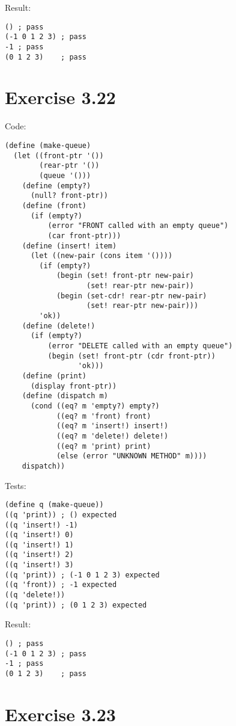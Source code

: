 \documentclass[../main.tex]{subfiles}
\begin{document}
Result:

\begin{lstlisting}
() ; pass
(-1 0 1 2 3) ; pass
-1 ; pass
(0 1 2 3)    ; pass
\end{lstlisting}

\section{Exercise 3.22}

Code:

\begin{lstlisting}
(define (make-queue)
  (let ((front-ptr '())
        (rear-ptr '())
        (queue '()))
    (define (empty?)
      (null? front-ptr))
    (define (front)
      (if (empty?)
          (error "FRONT called with an empty queue")
          (car front-ptr)))
    (define (insert! item)
      (let ((new-pair (cons item '())))
        (if (empty?)
            (begin (set! front-ptr new-pair)
                   (set! rear-ptr new-pair))
            (begin (set-cdr! rear-ptr new-pair)
                   (set! rear-ptr new-pair)))
        'ok))
    (define (delete!)
      (if (empty?)
          (error "DELETE called with an empty queue")
          (begin (set! front-ptr (cdr front-ptr))
                 'ok)))
    (define (print)
      (display front-ptr))
    (define (dispatch m)
      (cond ((eq? m 'empty?) empty?)
            ((eq? m 'front) front)
            ((eq? m 'insert!) insert!)
            ((eq? m 'delete!) delete!)
            ((eq? m 'print) print)
            (else (error "UNKNOWN METHOD" m))))
    dispatch))
\end{lstlisting}

Tests:

\begin{lstlisting}
(define q (make-queue))
((q 'print)) ; () expected
((q 'insert!) -1)
((q 'insert!) 0)
((q 'insert!) 1)
((q 'insert!) 2)
((q 'insert!) 3)
((q 'print)) ; (-1 0 1 2 3) expected
((q 'front)) ; -1 expected
((q 'delete!))
((q 'print)) ; (0 1 2 3) expected
\end{lstlisting}

Result:

\begin{lstlisting}
() ; pass
(-1 0 1 2 3) ; pass
-1 ; pass
(0 1 2 3)    ; pass
\end{lstlisting}

\section{Exercise 3.23}
\end{document}
